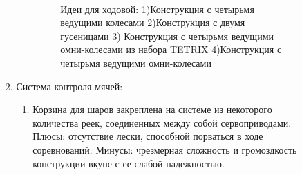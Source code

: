 \begin{enumerate}
\begin{enumerate}
\begin{enumerate}
\begin{enumerate}
	      \begin{figure}[h]
	      	\begin{minipage}[h]{0.2\linewidth}
	      		\center  
	      	\end{minipage}
	      	\begin{minipage}[h]{0.6\linewidth}
	          \caption{Идеи для ходовой: 1)Конструкция с четырьмя ведущими колесами 2)Конструкция с двумя гусеницами 3) Конструкция с четырьмя ведущими омни-колесами из набора TETRIX 4)Конструкция с четырьмя ведущими омни-колесами}
	        \end{minipage}
	      \end{figure}
	      
	    \end{enumerate}
	    
	    \item Система контроля мячей:
	    \begin{enumerate}
	      \item Корзина для шаров закреплена на системе из некоторого количества реек, соединенных между собой сервоприводами. Плюсы: отсутствие лески, способной порваться в ходе соревнований. Минусы: чрезмерная сложность и громоздкость конструкции вкупе с ее слабой надежностью.	
	      

\end{enumerate}
\end{enumerate}
\end{enumerate}
\end{enumerate}
